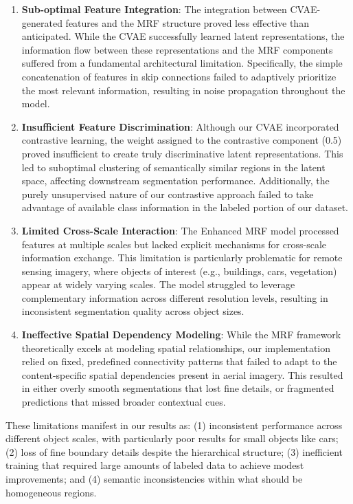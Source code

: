 \documentclass[conference]{IEEEtran}
\begin{document}
\begin{enumerate}
    \item \textbf{Sub-optimal Feature Integration}: The integration between CVAE-generated features and the MRF structure proved less effective than anticipated. While the CVAE successfully learned latent representations, the information flow between these representations and the MRF components suffered from a fundamental architectural limitation. Specifically, the simple concatenation of features in skip connections failed to adaptively prioritize the most relevant information, resulting in noise propagation throughout the model.
    
    \item \textbf{Insufficient Feature Discrimination}: Although our CVAE incorporated contrastive learning, the weight assigned to the contrastive component (0.5) proved insufficient to create truly discriminative latent representations. This led to suboptimal clustering of semantically similar regions in the latent space, affecting downstream segmentation performance. Additionally, the purely unsupervised nature of our contrastive approach failed to take advantage of available class information in the labeled portion of our dataset.
    
    \item \textbf{Limited Cross-Scale Interaction}: The Enhanced MRF model processed features at multiple scales but lacked explicit mechanisms for cross-scale information exchange. This limitation is particularly problematic for remote sensing imagery, where objects of interest (e.g., buildings, cars, vegetation) appear at widely varying scales. The model struggled to leverage complementary information across different resolution levels, resulting in inconsistent segmentation quality across object sizes.
    
    \item \textbf{Ineffective Spatial Dependency Modeling}: While the MRF framework theoretically excels at modeling spatial relationships, our implementation relied on fixed, predefined connectivity patterns that failed to adapt to the content-specific spatial dependencies present in aerial imagery. This resulted in either overly smooth segmentations that lost fine details, or fragmented predictions that missed broader contextual cues.
\end{enumerate}

These limitations manifest in our results as: (1) inconsistent performance across different object scales, with particularly poor results for small objects like cars; (2) loss of fine boundary details despite the hierarchical structure; (3) inefficient training that required large amounts of labeled data to achieve modest improvements; and (4) semantic inconsistencies within what should be homogeneous regions.
\end{document}
